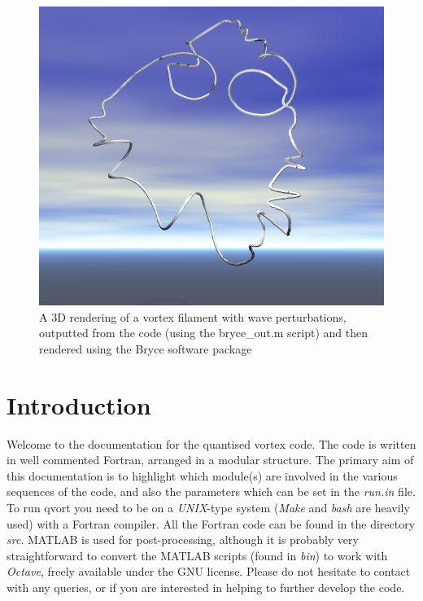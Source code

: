 \documentclass[12pt]{article}
\begin{document}
\maketitle
\pagestyle{plain}
\tableofcontents
\newpage
\clearpage
{}
\begin{figure}
  \begin{center}
    \includegraphics[scale=0.3]{./fig/header.png}%
    \caption{A 3D rendering of a vortex filament with wave perturbations, outputted from the {} code (using the bryce\_out.m script) and then rendered using the Bryce software package}
  \end{center}
\end{figure}
\section{Introduction}\label{Sec:int}
  Welcome to the documentation for the {} quantised vortex code.
  The code is written in well commented Fortran, arranged in a modular structure.
  The primary aim of this documentation is to highlight which module(s) are involved in the various sequences of the code, 
  and also the parameters which can be set in the {\it run.in} file.
  To run {\sc qvort} you need to be on a {\it UNIX}-type system ({\it Make} and {\it bash} are heavily used) with a Fortran compiler.
  All the Fortran code can be found in the directory {\it src}.
  MATLAB is used for post-processing, although it is probably very straightforward to convert the MATLAB scripts (found in {\it bin}) to work with {\it Octave}, freely available under the GNU license.
  Please do not hesitate to contact with any queries, or if you are interested in helping to further develop the code.
\end{document}
